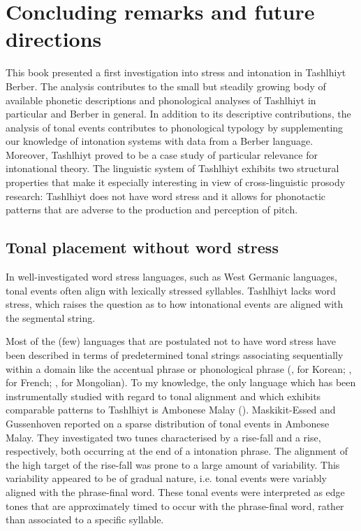 \chapter{Concluding remarks and future directions}
This book presented a first investigation into stress and intonation in Tashlhiyt Berber. The analysis contributes to the small but steadily growing body of available phonetic descriptions and phonological analyses of Tashlhiyt in particular and Berber in general. In addition to its descriptive contributions, the analysis of tonal events contributes to phonological typology by supplementing our knowledge of intonation systems with data from a Berber language. Moreover, Tashlhiyt proved to be a case study of particular relevance for intonational theory. The linguistic system of Tashlhiyt exhibits two structural properties that make it especially interesting in view of cross-linguistic prosody research: Tashlhiyt does not have word stress and it allows for phonotactic patterns that are adverse to the production and perception of pitch.

\section{Tonal placement without word stress}
In well-investigated word stress languages, such as West Germanic languages, tonal events often align with lexically stressed syllables. Tashlhiyt lacks word stress, which raises the question as to how intonational events are aligned with the segmental string. 

Most of the (few) languages that are postulated not to have word stress have been described in terms of predetermined tonal strings associating sequentially within a domain like the accentual phrase or phonological phrase (\citealt{Jun2005}, for Korean; \citealt{JunFougeron2002}, for French; \citealt{Karlsson2014}, for Mongolian). To my knowledge, the only language which has been instrumentally studied with regard to tonal alignment and which exhibits comparable patterns to Tashlhiyt is Ambonese Malay (\citealt{MaskGussenhoven2016}). Maskikit-Essed and Gussenhoven reported on a sparse distribution of tonal events in Ambonese Malay. They investigated two tunes characterised by a rise-fall and a rise, respectively, both occurring at the end of a intonation phrase. The alignment of the high target of the rise-fall was prone to a large amount of variability. This variability appeared to be of gradual nature, i.e. tonal events were variably aligned with the phrase-final word. These tonal events were interpreted as edge tones that are approximately timed to occur with the phrase-final word, rather than associated to a specific syllable.  

